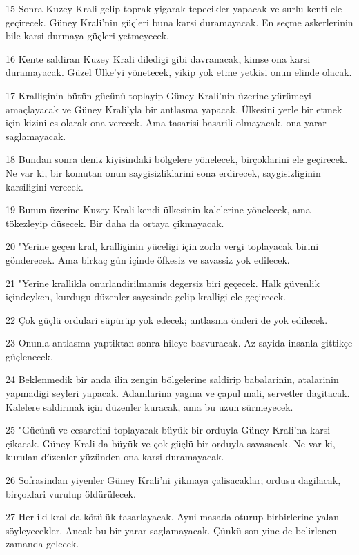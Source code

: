 \par 15 Sonra Kuzey Krali gelip toprak yigarak tepecikler yapacak ve surlu kenti ele geçirecek. Güney Krali'nin güçleri buna karsi duramayacak. En seçme askerlerinin bile karsi durmaya güçleri yetmeyecek.
\par 16 Kente saldiran Kuzey Krali diledigi gibi davranacak, kimse ona karsi duramayacak. Güzel Ülke'yi yönetecek, yikip yok etme yetkisi onun elinde olacak.
\par 17 Kralliginin bütün gücünü toplayip Güney Krali'nin üzerine yürümeyi amaçlayacak ve Güney Krali'yla bir antlasma yapacak. Ülkesini yerle bir etmek için kizini es olarak ona verecek. Ama tasarisi basarili olmayacak, ona yarar saglamayacak.
\par 18 Bundan sonra deniz kiyisindaki bölgelere yönelecek, birçoklarini ele geçirecek. Ne var ki, bir komutan onun saygisizliklarini sona erdirecek, saygisizliginin karsiligini verecek.
\par 19 Bunun üzerine Kuzey Krali kendi ülkesinin kalelerine yönelecek, ama tökezleyip düsecek. Bir daha da ortaya çikmayacak.
\par 20 "Yerine geçen kral, kralliginin yüceligi için zorla vergi toplayacak birini gönderecek. Ama birkaç gün içinde öfkesiz ve savassiz yok edilecek.
\par 21 "Yerine krallikla onurlandirilmamis degersiz biri geçecek. Halk güvenlik içindeyken, kurdugu düzenler sayesinde gelip kralligi ele geçirecek.
\par 22 Çok güçlü ordulari süpürüp yok edecek; antlasma önderi de yok edilecek.
\par 23 Onunla antlasma yaptiktan sonra hileye basvuracak. Az sayida insanla gittikçe güçlenecek.
\par 24 Beklenmedik bir anda ilin zengin bölgelerine saldirip babalarinin, atalarinin yapmadigi seyleri yapacak. Adamlarina yagma ve çapul mali, servetler dagitacak. Kalelere saldirmak için düzenler kuracak, ama bu uzun sürmeyecek.
\par 25 "Gücünü ve cesaretini toplayarak büyük bir orduyla Güney Krali'na karsi çikacak. Güney Krali da büyük ve çok güçlü bir orduyla savasacak. Ne var ki, kurulan düzenler yüzünden ona karsi duramayacak.
\par 26 Sofrasindan yiyenler Güney Krali'ni yikmaya çalisacaklar; ordusu dagilacak, birçoklari vurulup öldürülecek.
\par 27 Her iki kral da kötülük tasarlayacak. Ayni masada oturup birbirlerine yalan söyleyecekler. Ancak bu bir yarar saglamayacak. Çünkü son yine de belirlenen zamanda gelecek.
